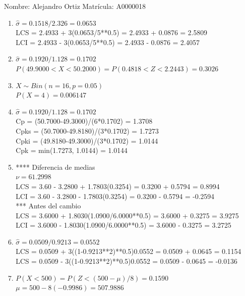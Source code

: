 \documentclass[8pt]{report}
\begin{document}
 \newpage

Nombre: \underline{\hspace*{.2in}}
Alejandro Ortiz
\underline{\hspace*{.2in}} \quad Matr\'icula:\underline{\hspace*{.2in}}
A0000018
\underline{\hspace*{.2in}} \\

\begin{enumerate}
\item $\hat\sigma = 0.1518/2.326 = 0.0653$\\
LCS = 2.4933 + 3(0.0653/5**0.5) = 2.4933 + 0.0876 = 2.5809\\
LCI = 2.4933 - 3(0.0653/5**0.5) = 2.4933 - 0.0876 = 2.4057
\item $\hat\sigma = 0.1920/1.128 = 0.1702$\\
$P(49.9000 < X < 50.2000) = P(0.4818 < Z < 2.2443) = 0.3026$\\
\item $X \sim Bin(n=16, p=0.05)$\\
$P(X = 4) = 0.006147$
\item $\hat\sigma = 0.1920/1.128 = 0.1702$\\
Cp = (50.7000-49.3000)/(6*0.1702) = 1.3708\\
Cpks = (50.7000-49.8180)/(3*0.1702) = 1.7273\\
Cpki = (49.8180-49.3000)/(3*0.1702) = 1.0144\\
Cpk = min(1.7273, 1.0144) = 1.0144
\item **** Diferencia de medias\\
$\nu = 61.2998$\\
LCS = 3.60 - 3.2800 + 1.7803(0.3254) = 0.3200 + 0.5794 = 0.8994\\
LCI = 3.60 - 3.2800 - 1.7803(0.3254) = 0.3200 - 0.5794 = -0.2594\\
*** Antes del cambio\\
LCS = 3.6000 + 1.8030(1.0900/6.0000**0.5) = 3.6000 + 0.3275 = 3.9275\\
LCI = 3.6000 - 1.8030(1.0900/6.0000**0.5) = 3.6000 - 0.3275 = 3.2725\\
\item $\hat\sigma = 0.0509/0.9213 = 0.0552$\\
LCS = 0.0509 + 3((1-0.9213**2)**0.5)0.0552 = 0.0509 + 0.0645 = 0.1154\\
LCS = 0.0509 - 3((1-0.9213**2)**0.5)0.0552 = 0.0509 - 0.0645 = -0.0136
\item $P(X < 500) = P(Z < (500-\mu)/8) = 0.1590$\\
$\mu = 500 - 8(-0.9986) = 507.9886$\\
\end{enumerate}
\end{document}
